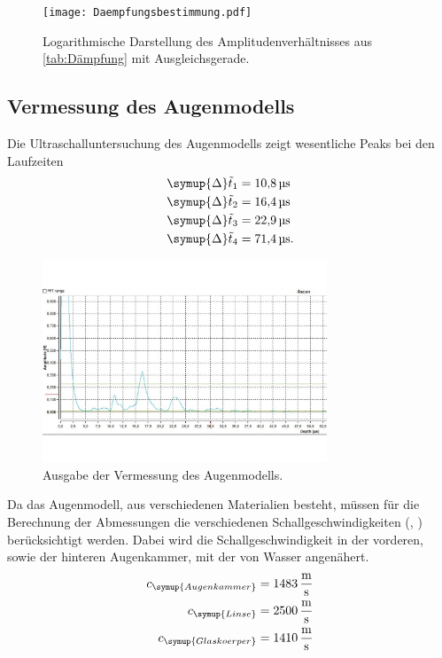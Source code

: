 \begin{figure}[H]
  \centering
  \texttt{[image: Daempfungsbestimmung.pdf]}
  \caption{Logarithmische Darstellung des Amplitudenverhältnisses aus \autoref{tab:Dämpfung} mit Ausgleichsgerade.}
  \label{fig:Dämpfung}
\end{figure}

\subsection{Vermessung des Augenmodells}
Die Ultraschalluntersuchung des Augenmodells zeigt wesentliche Peaks bei den Laufzeiten
\begin{align*}
  \symup{\Delta}\tilde{t}_1 &= \qty{10,8}{\micro\second} \\
  \symup{\Delta}\tilde{t}_2 &= \qty{16,4}{\micro\second} \\
  \symup{\Delta}\tilde{t}_3 &= \qty{22,9}{\micro\second} \\
  \symup{\Delta}\tilde{t}_4 &= \qty{71,4}{\micro\second}. \\
\end{align*}
\begin{figure}[H]
  \centering
  \includegraphics[height=6cm]{content/Abbildungen/Auge.pdf}
  \caption{Ausgabe der Vermessung des Augenmodells.}
  \label{fig:Messung Auge}
\end{figure}
Da das Augenmodell, aus verschiedenen Materialien besteht, müssen für die Berechnung der Abmessungen die verschiedenen 
Schallgeschwindigkeiten (\cite{czichos}, \cite{US1}) berücksichtigt werden. Dabei wird die Schallgeschwindigkeit in der vorderen, sowie der
hinteren Augenkammer, mit der von Wasser angenähert.
\begin{align*}
  c_{\symup{Augenkammer}} &= \qty{1483} {\metre\per\second} \\
  c_{\symup{Linse}} &= \qty{2500}{\metre\per\second} \\
  c_{\symup{Glaskoerper}} &= \qty{1410}{\metre\per\second} \\
\end{align*}
